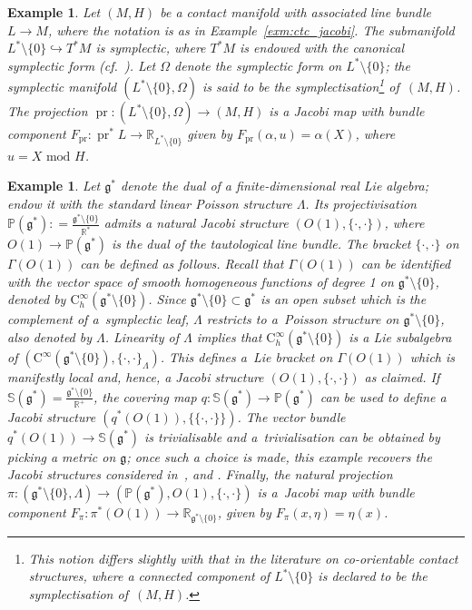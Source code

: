 \documentclass[pdftex]{sigma}
\numberwithin{equation}{section}
\newtheorem{Example}[Theorem]{Example}
\newcommand{\CM}{(M,H)} %
\newcommand{\SYM}{L^* \setminus \{0\}} %
\newcommand{\pg}{\mathbb{P}(\mathfrak{g}^*)} %
\newcommand{\RR}{\mathbb{R}}
\begin{document}
\begin{Example}\label{exm:symplectisation}
Let $\CM$ be a contact manifold with associated line bundle $L \to M$, where the notation is as in Example~\ref{exm:ctc_jacobi}. The submanifold $L^* \setminus \{0\} \hookrightarrow T^*M$ is symplectic, where $T^*M$ is endowed with the canonical symplectic form (cf.\ \cite[Def\/inition~2.3]{lerman_contact_toric}). Let $\Omega$ denote the symplectic form on $L^* \setminus \{0\}$; the symplectic manifold $(\SYM, \Omega)$ is said to be the {\it symplectisation}\footnote{This notion dif\/fers slightly with that in the literature on co-orientable contact structures, where a connected component of $\SYM$ is declared to be the symplectisation of~$\CM$.} of~$\CM$. The projection $\operatorname{pr} \colon (\SYM,\Omega) \to \CM$ is a Jacobi map with bundle component $F_{\operatorname{pr}} \colon \operatorname{pr}^* L \to \RR_{\SYM}$
 given by $F_{\operatorname{pr}}(\alpha, u) = \alpha(X)$, where $u = X \text{ mod } H$.
\end{Example}

\begin{Example}\label{exm:proj_dual_lie_algebra} Let $\mathfrak{g}^*$ denote the dual of a f\/inite-dimensional real Lie algebra; endow it with the standard linear Poisson structure $\Lambda$. Its projectivisation $\pg : =\frac{\mathfrak{g}^* \setminus \{0\}}{\RR^*}$ admits a natural Jacobi structure $(O(1),\{\cdot,\cdot\})$, where $O(1) \to \pg$ is the dual of the tautological line bundle. The bracket $\{\cdot,\cdot\}$ on $ \Gamma(O(1))$ can be def\/ined as follows. Recall that $\Gamma(O(1))$ can be identif\/ied with the vector space of smooth homogeneous functions of degree 1 on $\mathfrak{g}^* \setminus \{0\}$, denoted by $\mathrm{C}^{\infty}_{h}(\mathfrak{g}^* \setminus \{0\})$. Since $\mathfrak{g}^* \setminus \{0\} \subset \mathfrak{g}^*$ is an open subset which is the complement of a~symplectic leaf, $\Lambda$ restricts to a~Poisson structure on $\mathfrak{g}^* \setminus \{0\}$, also denoted by $\Lambda$. Linearity of $\Lambda$ implies that $\mathrm{C}^{\infty}_{h}(\mathfrak{g}^* \setminus \{0\})$ is a Lie subalgebra of $(\mathrm{C}^{\infty}(\mathfrak{g}^* \setminus \{0\}), \{\cdot,\cdot\}_{\Lambda})$. This def\/ines a~Lie bracket on $\Gamma(O(1))$ which is manifestly local and, hence, a Jacobi structure $(O(1),\{\cdot,\cdot\})$ as claimed. If $\mathbb{S}(\mathfrak{g}^*) = \frac{\mathfrak{g}^* \setminus \{0\}}{\RR^+}$, the covering map $q \colon \mathbb{S}(\mathfrak{g}^*) \to \pg$ can be used to def\/ine a Jacobi structure $(q^*(O(1)),\{\{\cdot,\cdot\}\})$. The vector bundle $q^*(O(1)) \to \mathbb{S}(\mathfrak{g}^*)$ is trivialisable and a~trivialisation can be obtained by picking a metric on $\mathfrak{g}$; once such a choice is made, this example recovers the Jacobi structures considered in~\cite{deleon,Lich78}, and \cite[Example~2.3]{Zambon}. Finally, the natural projection $\pi \colon (\mathfrak{g}^* \setminus \{0\},\Lambda) \to (\pg, O(1),\{\cdot,\cdot\})$ is a~Jacobi map with bundle component $F_{\pi}\colon \pi^*(O(1)) \to \RR_{\mathfrak{g}^* \setminus \{0\}}$, given by $F_{\pi}(x,\eta) = \eta(x)$.
\end{Example}
\end{document}

